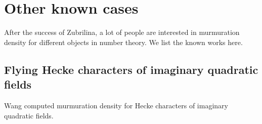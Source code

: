 \section{Other known cases}
\label{sec:other}

After the success of Zubrilina, a lot of people are interested in murmuration density for different objects in number theory.
We list the known works here.


\subsection{Flying Hecke characters of imaginary quadratic fields}

Wang \cite{wang2025murmurations} computed murmuration density for Hecke characters of imaginary quadratic fields.

